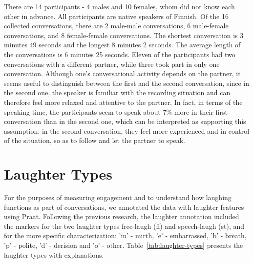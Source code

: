 \documentclass[10pt,journal,compsoc]{IEEEtran}
\begin{document}
There are 14 participants - 4 males and 10 females, whom did not know each other in advance. All participants are native speakers of Finnish. Of the 16 collected conversations, there are 2 male-male conversations, 6 male-female conversations, and 8 female-female conversations. The shortest conversation is 3 minutes 49 seconds and the longest 8 minutes 2 seconds. The average length of the conversations is 6 minutes 25 seconds. Eleven of the participants had two conversations with a different partner, while three took part in only one conversation. Although one’s conversational activity depends on the partner, it seems useful to distinguish between the first and the second conversation, since in the second one, the speaker is familiar with the recording situation and can therefore feel more relaxed and attentive to the partner. In fact, in terms of the speaking time, the participants seem to speak about 7\% more in their first conversation than in the second one, which can be interpreted as supporting this assumption: in the second conversation, they feel more experienced and in control of the situation, so as to follow and let the partner to speak.

\section{Laughter Types}
\label{sec:laughter-types}

For the purposes of measuring engagement and to understand how laughing functions as part of conversations, we annotated the data with laughter features using Praat. Following the previous research, the laughter annotation included the markers for the two laughter types free-laugh (fl) and speech-laugh (st), and for the more specific characterization: 'm' - mirth, 'e' - embarrassed, 'b' - breath, 'p' - polite, 'd' - derision and 'o' - other. Table~\ref{tab:laughter-types} presents the laughter types with explanations.
\end{document}
